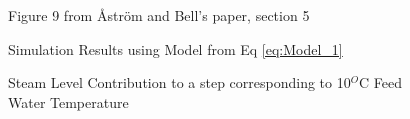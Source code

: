        \begin{figure}[ht]
            \begin{center}
                
                Figure 9 from \r{A}str\"{o}m and Bell's paper, section 5 \cite{Astrom}
                
                
                Simulation Results using Model from Eq \eqref{eq:Model_1}
                
                \caption{Steam Level Contribution to a step corresponding to 10$^O$C Feed Water Temperature}
                \label{fig:Fig9C}
            \end{center}
        \end{figure}  %
        
